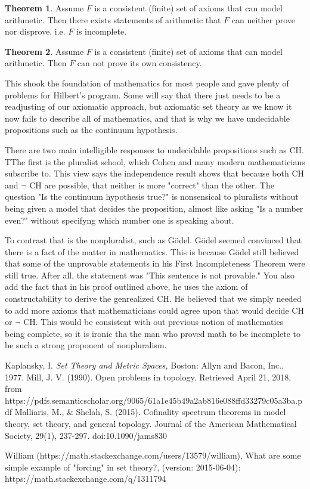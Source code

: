 \documentclass[12pt]{article}
\theoremstyle{definition}
\newtheorem{theorem}{Theorem}[section]
\begin{document}
\begin{theorem}
    Assume $F$ is a consistent (finite) set of axioms that can model arithmetic. Then there exists statements of arithmetic that $F$ can neither prove nor disprove, i.e. $F$ is incomplete.
\end{theorem}

\begin{theorem}
    Assume $F$ is a consistent (finite) set of axioms that can model arithmetic. Then $F$ can not prove its own consistency.
\end{theorem}


This shook the foundation of mathematics for most people and gave plenty of problems for Hilbert's program. Some will say that there just needs to be a readjusting of our axiomatic approach, but axiomatic set theory as we know it now fails to describe all of mathematics, and that is why we have undecidable propositions such as the continuum hypothesis.

There are two main intelligible responses to undecidable propositions such as CH. TThe first is the pluralist school, which Cohen and many modern mathematicians subscribe to. This view says the independence result shows that because both CH and $\neg$ CH are possible, that neither is more "correct" than the other. The question "Is the continuum hypothesis true?" is nonsensical to pluralists without being given a model that decides the proposition, almost like asking "Is a number even?" without specifyng which number one is speaking about.

To contrast that is the nonpluralist, such as Gödel. Gödel seemed convinced that there is a fact of the matter in mathematics. This is because Gödel still believed that some of the unprovable statements in his First Incompleteness Theorem were still true. After all, the statement was "This sentence is not provable." You also add the fact that in his proof outlined above, he uses the axiom of constructability to derive the genrealized CH. He believed that we simply needed to add more axioms that mathematicians could agree upon that would decide CH or $\neg$ CH. This would be consistent with out previous notion of mathematics being complete, so it is ironic tha the man who proved math to be incomplete to be such a strong proponent of nonpluralism.



\newpage
\begin{thebibliography}{9}
    Kaplansky, I. \textit{Set Theory and Metric Spaces,} Boston: Allyn and Bacon, Inc., 1977.
    Mill, J. V. (1990). Open problems in topology. Retrieved April 21, 2018, from https://pdfs.semanticscholar.org/9065/61a1e45b49a2ab816e088ffd33279c05a3ba.pdf
    Malliaris, M., & Shelah, S. (2015). Cofinality spectrum theorems in model theory, set theory, and general topology. Journal of the American Mathematical Society, 29(1), 237-297. doi:10.1090/jams830

    William (https://math.stackexchange.com/users/13579/william), What are some simple example of "forcing" in set theory?, (version: 2015-06-04): https://math.stackexchange.com/q/1311794



\end{thebibliography}
\end{document}
